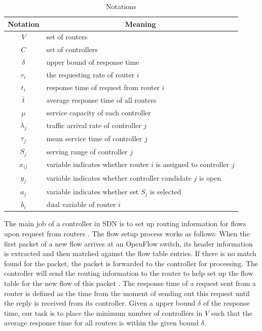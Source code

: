\documentclass[conference]{IEEEtran}
\begin{document}
\begin{table}
\caption{Notations}
\label{table:notations}
\centering
\begin{tabular}{|c|l|}
\hline Notation & \multicolumn{1}{|c|}{Meaning} \\
\hline $V$ & set of routers \\
\hline $C$ & set of controllers \\
\hline $\delta$ & upper bound of response time\\
\hline $r_i$ & the requesting rate of router $i$ \\
\hline $t_i$ & response time of request from router $i$ \\
\hline \rule{0pt}{0.3cm} $\bar{t}$ & average response time of all routers \\
\hline $\mu$ & service capacity of each controller \\
\hline $\lambda_j$ & traffic arrival rate of controller $j$ \\
\hline $\tau_j$ & mean service time of controller $j$ \\
\hline $S_j$ & serving range of controller $j$ \\
\hline $x_{ij}$ & variable indicates whether router $i$ is assigned to controller $j$ \\
\hline $y_j$ & variable indicates whether controller candidate $j$ is open \\
\hline $a_j$ & variable indicates whether set $S_j$ is selected \\
\hline $b_i$ & dual variable of router $i$ \\
\hline
\end{tabular}
\end{table}

The main job of a controller in SDN is to set up routing information for flows upon request from routers \cite{tootoonchian2012controller}. The flow setup process works as follows: When the first packet of a new flow arrives at an OpenFlow switch, its header information is extracted and then matched against the flow table entries. If there is no match found for the packet, the packet is forwarded to the controller for processing. The controller will send the routing information to the router to help set up the flow table for the new flow of this packet \cite{sezer2013we}. The response time of a request sent from a router is defined as the time from the moment of sending out this request until the reply is received from its controller. Given a upper bound $\delta$ of the response time, our task is to place the minimum number of controllers in $V$ such that the average response time for all routers is within the given bound $\delta$. 
\end{document}
